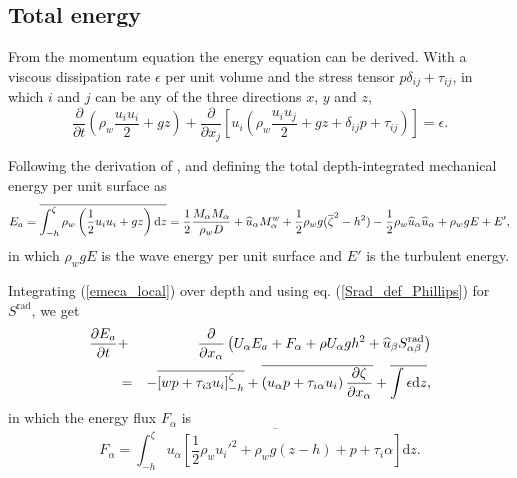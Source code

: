 \subsection{Total energy}
From the momentum equation the energy equation can be derived. With a viscous dissipation rate $\epsilon$ per unit volume and the stress 
tensor $p \delta_{ij} + \tau_{ij}$,  in which $i$ and $j$ can be any of the three directions  $x$, $y$ and $z$, 
\begin{equation}
 \frac{\partial }{\partial t}\left(\rho_w \frac{u_i u_i }{2}   + g z\right) + \frac{\partial }{\partial x_j}
 \left[u_i \left( \rho_w \frac{u_i u_j }{2}   + g z + \delta_{ij} p + \tau_{ij} \right) \right] 
= \epsilon.\label{emeca_local}
\end{equation}


Following the derivation of \citet[][page 63]{Phillips1977}, and defining the total depth-integrated mechanical energy per unit surface as
\begin{equation}
 E_a = \overline{\int_{-h}^\zeta \rho_w \left(\frac{1}{2} u_i u_i + gz\right)  \mathrm{d}z} = \frac{1}{2} \frac{M_\alpha M_\alpha}{\rho_w D} + 
 \widehat{u}_\alpha M^w_\alpha + \frac{1}{2} \rho_w g (\overline{\zeta}^2 - h^2) - \frac{1}{2} \rho_w \widehat{u}_\alpha \widehat{u}_\alpha + \rho_w g E + E', 
\end{equation}
in which $\rho_w g E$ is the wave energy per unit surface and $E'$ is the turbulent energy.

Integrating (\ref{emeca_local}) over depth and using eq. (\ref{Srad_def_Phillips}) for $S^{\mathrm{rad}}$, we get  
\begin{eqnarray}
 \frac{\partial E_a}{\partial t} & + & \frac{\partial }{\partial x_\alpha} \left( U_\alpha E_a + F_\alpha + 
\rho  U_\alpha g h^2 + \widehat{u}_\beta S^{\mathrm{rad}}_{\alpha \beta} \right) \nonumber \\
&=& - \overline{\left[ w  p + \tau_{i 3} u_i \right]^{\zeta}_{-h}}+ \overline{ \left( u_\alpha  p
 + \tau_{i \alpha} u_i \right)\frac{\partial \zeta}{\partial x_\alpha}}+ \overline{\int \epsilon {\mathrm d}z}, \label{E_a}
\end{eqnarray}
in which the energy flux $F_\alpha$ is 
\begin{equation}
 F_\alpha =  \overline{\int_{-h}^\zeta u_\alpha \left[ \frac{1}{2}  \rho_w  u_i'^2 +  \rho_w  g(z-h)+ p + \tau_i \alpha \right]  \mathrm{d}z}.
\end{equation}


